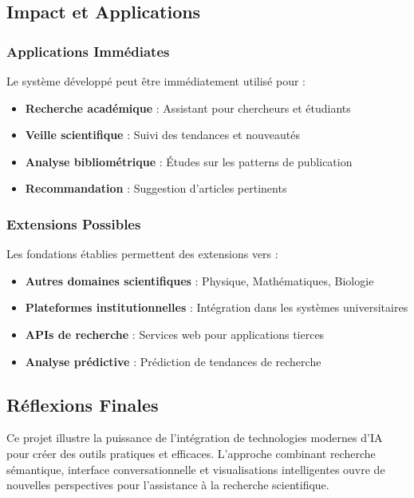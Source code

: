 \documentclass[12pt,a4paper]{article}
\begin{document}
\subsection{Impact et Applications}

\subsubsection{Applications Immédiates}

Le système développé peut être immédiatement utilisé pour :

\begin{itemize}
    \item \textbf{Recherche académique} : Assistant pour chercheurs et étudiants
    \item \textbf{Veille scientifique} : Suivi des tendances et nouveautés
    \item \textbf{Analyse bibliométrique} : Études sur les patterns de publication
    \item \textbf{Recommandation} : Suggestion d'articles pertinents
\end{itemize}

\subsubsection{Extensions Possibles}

Les fondations établies permettent des extensions vers :

\begin{itemize}
    \item \textbf{Autres domaines scientifiques} : Physique, Mathématiques, Biologie
    \item \textbf{Plateformes institutionnelles} : Intégration dans les systèmes universitaires
    \item \textbf{APIs de recherche} : Services web pour applications tierces
    \item \textbf{Analyse prédictive} : Prédiction de tendances de recherche
\end{itemize}

\subsection{Réflexions Finales}

Ce projet illustre la puissance de l'intégration de technologies modernes d'IA pour créer des outils pratiques et efficaces. L'approche combinant recherche sémantique, interface conversationnelle et visualisations intelligentes ouvre de nouvelles perspectives pour l'assistance à la recherche scientifique.
\end{document}
